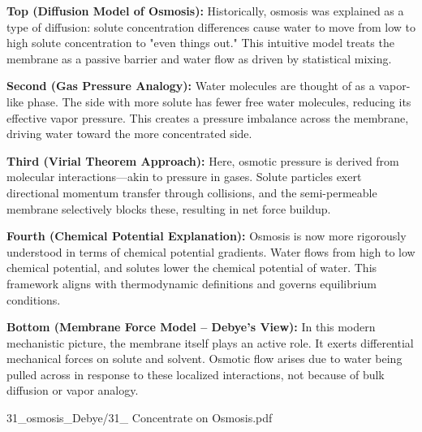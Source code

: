 \begin{SideNotePage}{
  \textbf{Top (Diffusion Model of Osmosis):}  
  Historically, osmosis was explained as a type of diffusion: solute concentration differences cause water to move from low to high solute concentration to "even things out." This intuitive model treats the membrane as a passive barrier and water flow as driven by statistical mixing. \par

  \textbf{Second (Gas Pressure Analogy):}  
  Water molecules are thought of as a vapor-like phase. The side with more solute has fewer free water molecules, reducing its effective vapor pressure. This creates a pressure imbalance across the membrane, driving water toward the more concentrated side. \par

  \textbf{Third (Virial Theorem Approach):}  
  Here, osmotic pressure is derived from molecular interactions—akin to pressure in gases. Solute particles exert directional momentum transfer through collisions, and the semi-permeable membrane selectively blocks these, resulting in net force buildup. \par

  \textbf{Fourth (Chemical Potential Explanation):}  
  Osmosis is now more rigorously understood in terms of chemical potential gradients. Water flows from high to low chemical potential, and solutes lower the chemical potential of water. This framework aligns with thermodynamic definitions and governs equilibrium conditions. \par

  \textbf{Bottom (Membrane Force Model – Debye's View):}  
  In this modern mechanistic picture, the membrane itself plays an active role. It exerts differential mechanical forces on solute and solvent. Osmotic flow arises due to water being pulled across in response to these localized interactions, not because of bulk diffusion or vapor analogy. \par
}{31_osmosis_Debye/31_ Concentrate on Osmosis.pdf}
\end{SideNotePage}
